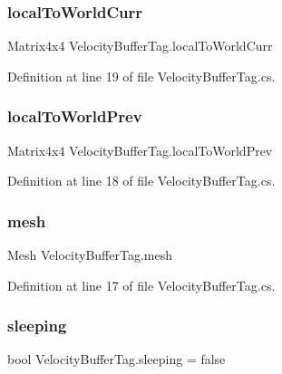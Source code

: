 \subsubsection{\texorpdfstring{local\+To\+World\+Curr}{localToWorldCurr}}
{\footnotesize\ttfamily Matrix4x4 Velocity\+Buffer\+Tag.\+local\+To\+World\+Curr}



Definition at line 19 of file Velocity\+Buffer\+Tag.\+cs.

\mbox{\label{class_velocity_buffer_tag_a0833e64a1ec98596b324b8f8c72f1ad0}} 
\subsubsection{\texorpdfstring{local\+To\+World\+Prev}{localToWorldPrev}}
{\footnotesize\ttfamily Matrix4x4 Velocity\+Buffer\+Tag.\+local\+To\+World\+Prev}



Definition at line 18 of file Velocity\+Buffer\+Tag.\+cs.

\mbox{\label{class_velocity_buffer_tag_a163f9e15132764a035a268802494a86d}} 
\subsubsection{\texorpdfstring{mesh}{mesh}}
{\footnotesize\ttfamily Mesh Velocity\+Buffer\+Tag.\+mesh}



Definition at line 17 of file Velocity\+Buffer\+Tag.\+cs.

\mbox{\label{class_velocity_buffer_tag_af5527fdf6f713e520396f519369ddda8}} 
\subsubsection{\texorpdfstring{sleeping}{sleeping}}
{\footnotesize\ttfamily bool Velocity\+Buffer\+Tag.\+sleeping = false}



